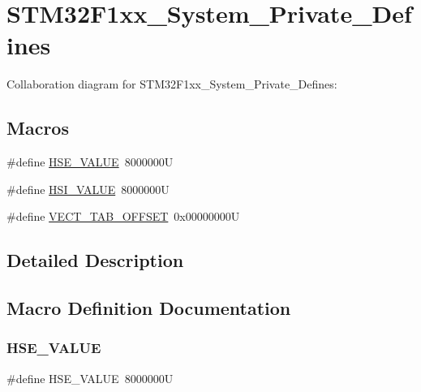 \hypertarget{group__STM32F1xx__System__Private__Defines}{}\section{S\+T\+M32\+F1xx\+\_\+\+System\+\_\+\+Private\+\_\+\+Defines}
\label{group__STM32F1xx__System__Private__Defines}
Collaboration diagram for S\+T\+M32\+F1xx\+\_\+\+System\+\_\+\+Private\+\_\+\+Defines\+:
\subsection*{Macros}
\begin{DoxyCompactItemize}
\item 
\#define \hyperlink{group__STM32F1xx__System__Private__Defines_gaeafcff4f57440c60e64812dddd13e7cb}{H\+S\+E\+\_\+\+V\+A\+L\+UE}~8000000U
\item 
\#define \hyperlink{group__STM32F1xx__System__Private__Defines_gaaa8c76e274d0f6dd2cefb5d0b17fbc37}{H\+S\+I\+\_\+\+V\+A\+L\+UE}~8000000U
\item 
\#define \hyperlink{group__STM32F1xx__System__Private__Defines_ga40e1495541cbb4acbe3f1819bd87a9fe}{V\+E\+C\+T\+\_\+\+T\+A\+B\+\_\+\+O\+F\+F\+S\+ET}~0x00000000U
\end{DoxyCompactItemize}


\subsection{Detailed Description}


\subsection{Macro Definition Documentation}
\mbox{\label{group__STM32F1xx__System__Private__Defines_gaeafcff4f57440c60e64812dddd13e7cb}} 
\subsubsection{\texorpdfstring{H\+S\+E\+\_\+\+V\+A\+L\+UE}{HSE\_VALUE}}
{\footnotesize\ttfamily \#define H\+S\+E\+\_\+\+V\+A\+L\+UE~8000000U}


